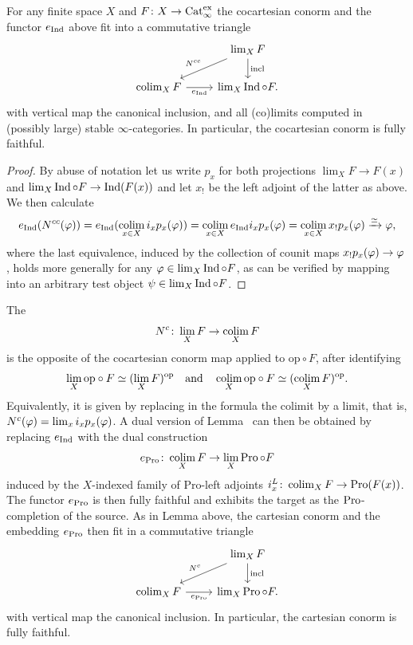 \begin{lemma}
\label{lem:cocartesian_norm}%
For any finite space $X$ and $F\colon X\to \mathrm{Cat}_\infty^{\mathrm{ex}}$ the cocartesian conorm and the functor $e_{\operatorname{Ind}}$ above fit into a commutative triangle 
 \begin{equation}
\begin{tikzcd}
 & \lim_X F \ar[ld, "\ccconorm"'] \ar[d, "\mathrm{incl}"] \\
 \colim_X F \ar[r, "e_{\Ind}"'] & \lim_X \Ind\circ F.
\end{tikzcd}
\end{equation}
with vertical map the canonical inclusion, and all (co)limits computed in (possibly large) stable $\infty$-categories. In particular, the cocartesian conorm is fully faithful.
\end{lemma}
\begin{proof}
By abuse of notation let us write $p_x$ for both projections $\lim_X F \to F(x)$ and $\lim_X \operatorname{Ind}\circ F \to \operatorname{Ind}(F(x))$ and let $x_!$ be the left adjoint of the latter as above. %
We then calculate
\[
e_{\operatorname{Ind}}(N^{cc}(\varphi)) = e_{\operatorname{Ind}}(\mathop{\mathrm{colim}}_{x \in X}i_xp_x(\varphi)) = \mathop{\mathrm{colim}}_{x \in X}e_{\operatorname{Ind}}i_xp_x(\varphi) = \mathop{\mathrm{colim}}_{x \in X} x_!p_x(\varphi) \xrightarrow{\simeq} \varphi ,
\]
where the last equivalence, induced by the collection of counit maps $x_!p_x(\varphi) \to \varphi$, holds more generally for any $\varphi \in \lim_X \operatorname{Ind}\circ F$, as can be verified by mapping into an arbitrary test object $\psi \in \lim_X \operatorname{Ind}\circ F$.
\end{proof}



The  
\[
N^c\colon \lim_X F\to \mathop{\mathrm{colim}}_X F
\]
is the opposite of the cocartesian conorm map applied to $\mathrm{op}\circ F$, after identifying 
\[
\lim_X \mathrm{op}\circ F \simeq (\lim_X F)^\mathrm{op} \quad \mathrm{and} \quad \mathop{\mathrm{colim}}_X \mathrm{op}\circ F \simeq (\mathop{\mathrm{colim}}_X F)^\mathrm{op}.
\]
Equivalently, it is given by replacing in the formula the colimit by a limit, that is, $N^c(\varphi) = \lim_x i_xp_x(\varphi)$. %
A dual version of Lemma~ can then be obtained by replacing $e_{\operatorname{Ind}}$ with the dual construction
\[
e_{\operatorname{Pro}}\colon \mathop{\mathrm{colim}}_X F \to \lim_{X} \operatorname{Pro}\circ F
\]
induced by the $X$-indexed family of Pro-left adjoints $i_x^L\colon \mathop{\mathrm{colim}}_X F \to \operatorname{Pro}(F(x))$.
The functor $e_{\operatorname{Pro}}$ is then fully faithful and exhibits the target as the $\operatorname{Pro}$-completion of the source. As in Lemma  above, the cartesian conorm and the embedding $e_{\operatorname{Pro}}$ then fit in a commutative triangle
\begin{equation}
\label{eq:cartesian_conorm_and_e_Pro}%
\begin{tikzcd}
 & \lim_X F \ar[ld, "\cconorm"'] \ar[d, "\mathrm{incl}"] \\
 \colim_X F \ar[r, "e_{\Pro}"'] & \lim_X \Pro\circ F.
\end{tikzcd}
\end{equation}
with vertical map the canonical inclusion. In particular, the cartesian conorm is fully faithful.





